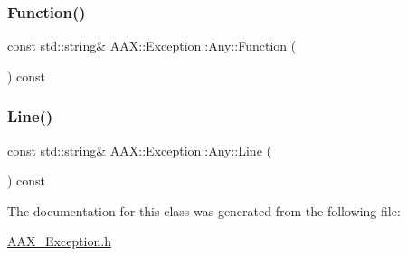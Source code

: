 \subsubsection{\texorpdfstring{Function()}{Function()}}
{\footnotesize\ttfamily const std\+::string\& A\+A\+X\+::\+Exception\+::\+Any\+::\+Function (\begin{DoxyParamCaption}{ }\end{DoxyParamCaption}) const\hspace{0.3cm}{\ttfamily [inline]}}

\mbox{\label{a01593_acb449c037d3ff8e221ba86a72cda93c8}} 
\subsubsection{\texorpdfstring{Line()}{Line()}}
{\footnotesize\ttfamily const std\+::string\& A\+A\+X\+::\+Exception\+::\+Any\+::\+Line (\begin{DoxyParamCaption}{ }\end{DoxyParamCaption}) const\hspace{0.3cm}{\ttfamily [inline]}}



The documentation for this class was generated from the following file\+:\begin{DoxyCompactItemize}
\item 
\mbox{\hyperlink{a00497}{A\+A\+X\+\_\+\+Exception.\+h}}\end{DoxyCompactItemize}
